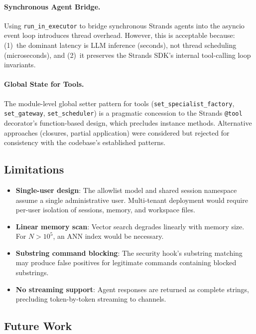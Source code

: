 \documentclass[9pt,twocolumn,letterpaper]{extarticle}
\begin{document}
\paragraph{Synchronous Agent Bridge.}
Using \texttt{run\_in\_executor} to bridge synchronous Strands agents into the asyncio event loop introduces thread overhead.
However, this is acceptable because: (1)~the dominant latency is LLM inference (seconds), not thread scheduling (microseconds), and (2)~it preserves the Strands SDK's internal tool-calling loop invariants.

\paragraph{Global State for Tools.}
The module-level global setter pattern for tools (\texttt{set\_specialist\_factory}, \texttt{set\_gateway}, \texttt{set\_scheduler}) is a pragmatic concession to the Strands \texttt{@tool} decorator's function-based design, which precludes instance methods.
Alternative approaches (closures, partial application) were considered but rejected for consistency with the codebase's established patterns.

\subsection{Limitations}

\begin{itemize}[leftmargin=*,noitemsep,topsep=3pt]
  \item \textbf{Single-user design}: The allowlist model and shared session namespace assume a single administrative user.
  Multi-tenant deployment would require per-user isolation of sessions, memory, and workspace files.
  \item \textbf{Linear memory scan}: Vector search degrades linearly with memory size. For $N > 10^5$, an ANN index would be necessary.
  \item \textbf{Substring command blocking}: The security hook's substring matching may produce false positives for legitimate commands containing blocked substrings.
  \item \textbf{No streaming support}: Agent responses are returned as complete strings, precluding token-by-token streaming to channels.
\end{itemize}

\subsection{Future Work}
\end{document}
